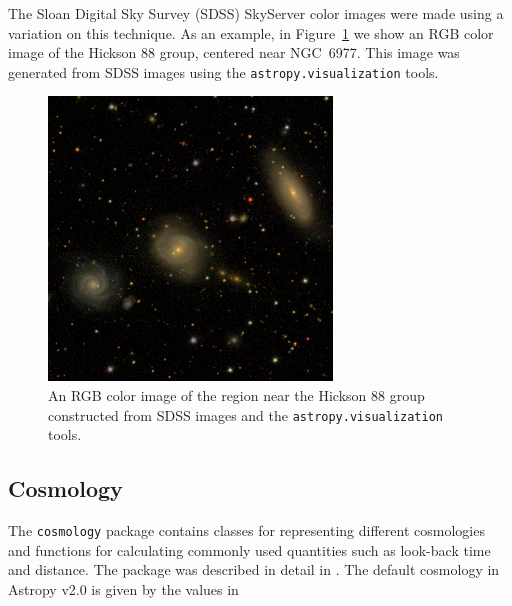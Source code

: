\documentclass[modern]{aastex61}
\newcommand{\package}[1]{\texttt{#1}\xspace}
\newcommand{\astropy}{Astropy\xspace}
\renewcommand{\figurename}{Figure\xspace}
\begin{document}
The Sloan Digital Sky Survey (SDSS) SkyServer color images were made using a variation on this technique.  As an example, in \figurename~\ref{fig:ngc6977} we show an RGB color image of the Hickson 88 group, centered near NGC~6977.  This image was generated from SDSS images using the \package{astropy.visualization} tools.

\begin{figure}
\includegraphics[width=\textwidth]{ngc6977.png}
\caption{An RGB color image of the region near the Hickson 88 group
constructed from SDSS images and the \package{astropy.visualization}
tools.
\label{fig:ngc6977}}
\end{figure}


\subsection{Cosmology}

The \package{cosmology} package contains classes for representing different cosmologies and functions for calculating commonly used quantities such as look-back time and distance.   The package was described in detail in \cite{astropy}.  The  default cosmology in \astropy v2.0 is given by the values in \cite{2016A&A...594A..13P}
\end{document}
